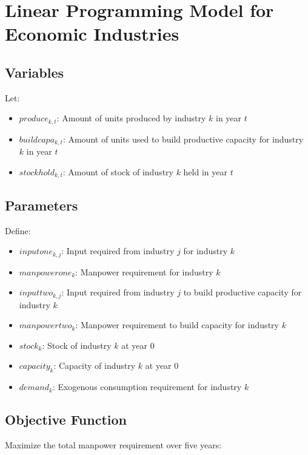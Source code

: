 \documentclass{article}
\begin{document}
\section*{Linear Programming Model for Economic Industries}

\subsection*{Variables}

Let:
\begin{itemize}
    \item \( produce_{k, t} \): Amount of units produced by industry \( k \) in year \( t \)
    \item \( buildcapa_{k, t} \): Amount of units used to build productive capacity for industry \( k \) in year \( t \)
    \item \( stockhold_{k, t} \): Amount of stock of industry \( k \) held in year \( t \)
\end{itemize}

\subsection*{Parameters}

Define:
\begin{itemize}
    \item \( inputone_{k,j} \): Input required from industry \( j \) for industry \( k \)
    \item \( manpowerone_{k} \): Manpower requirement for industry \( k \)
    \item \( inputtwo_{k,j} \): Input required from industry \( j \) to build productive capacity for industry \( k \)
    \item \( manpowertwo_{k} \): Manpower requirement to build capacity for industry \( k \)
    \item \( stock_{k} \): Stock of industry \( k \) at year 0
    \item \( capacity_{k} \): Capacity of industry \( k \) at year 0
    \item \( demand_{k} \): Exogenous consumption requirement for industry \( k \)
\end{itemize}

\subsection*{Objective Function}

Maximize the total manpower requirement over five years:
\end{document}
